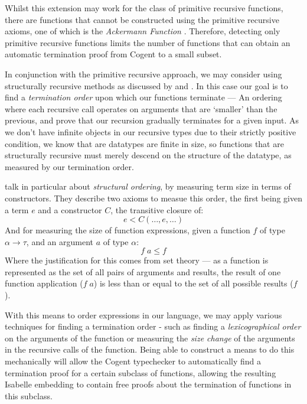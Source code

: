 Whilst this extension may work for the class of primitive recursive functions, there are functions that
cannot be constructed using the primitive recursive axioms, one of which is the \textit{Ackermann Function}
\citep{Ackermann}. Therefore, detecting only primitive recursive functions limits the number of functions that
can obtain an automatic termination proof from Cogent to a small subset.

In conjunction with the primitive recursive approach, we may consider using
structurally recursive methods as discussed by \citet{StrucrecStructures} and \citet{PredicateStructrec}.
In this case our goal is to find a \textit{termination order} upon which our functions terminate --- An ordering
where each recursive call operates on arguments that are `smaller' than the previous, and prove 
that our recursion gradually terminates for a given input. 
As we don't have infinite objects in our recursive types due to their strictly positive condition, 
we know that are datatypes are finite in size, so functions that are  structurally recursive must
merely descend on the structure of the datatype, as measured by our termination order.

\citet{PredicateStructrec} talk in particular about \textit{structural ordering}, by measuring term size in
terms of constructors. They describe two axioms to measue this order, the first being given
a term $e$ and a constructor $C$, the transitive closure of:
$$
    e < C (\dots, e, \dots)
$$
And for measuring the size of function expressions, given a function $f$ of type $\alpha \longrightarrow \tau$,
and an argument $a$ of type $\alpha$:
$$
    f\; a \leq f
$$
Where the justification for this comes from set theory --- as a function is represented as the set of all pairs of
arguments and results, the result of one function application ($f\; a$) is less than or equal to the set of
all possible results ($f$).

With this means to order expressions in our language, we may apply various techniques for finding a termination
order - such as finding a \textit{lexicographical order} on the arguments of the function or measuring the \textit{size change}
of the arguments in the recursive calls of the function. Being able to construct a means to do this
mechanically will allow the Cogent typechecker to automatically find a termination proof for a certain subclass
of functions, allowing the resulting Isabelle embedding to contain free proofs about the termination of functions in this subclass. 
